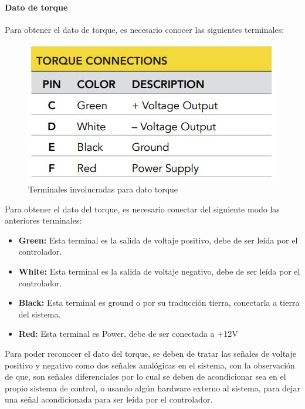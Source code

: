 \documentclass[12pt,titlepage]{article}
\begin{document}
\paragraph{Dato de torque}\leavevmode\newline

Para obtener el dato de torque, es necesario conocer las siguientes terminales: \\ 
\begin{figure}[htbp]
\hspace*{5.2cm} 
\includegraphics[scale=0.58]{dato_torque_pin}
\caption{Terminales involucradas para dato torque}
\end{figure}

Para obtener el dato del torque, es necesario conectar del siguiente modo las anteriores terminales: 
\begin{itemize}
\item \textbf{Green:} Esta terminal es la salida de voltaje positivo, debe de ser leída por el controlador. 
\item \textbf{White:} Esta terminal es la salida de voltaje negativo, debe de ser leída por el controlador. 
\item \textbf{Black:} Esta terminal es ground o por su traducción tierra, conectarla a tierra  del sistema.
\item \textbf{Red:} Esta terminal es Power, debe de ser conectada a +12V 
\end{itemize}

Para poder reconocer el dato del torque, se deben de tratar las señales de voltaje positivo y negativo como dos señales analógicas en el sistema, con la observación de que, son señales diferenciales por lo cual se deben de acondicionar sea en el propio sistema de control, o usando algún hardware externo al sistema, para dejar una señal acondicionada para ser leída por el controlador. \\
\end{document}
